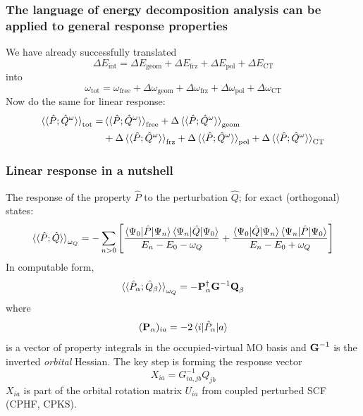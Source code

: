 \documentclass[%
    xcolor=usenames,dvipsnames,svgnames%
]{beamer}
\begin{document}
\begin{frame}
  \frametitle{The language of energy decomposition analysis can be applied to general response properties}
  We have already successfully translated
  \begin{equation*}
    \Delta E_{\text{int}} = \Delta E_{\text{geom}} + \Delta E_{\text{frz}} + \Delta E_{\text{pol}} + \Delta E_{\text{CT}}
  \end{equation*}
  into
  \begin{equation*}
    \omega_{\text{tot}} = \omega_{\text{free}} + \Delta \omega_{\text{geom}} + \Delta \omega_{\text{frz}} + \Delta \omega_{\text{pol}} + \Delta \omega_{\text{CT}}
  \end{equation*}
  Now do the same for linear response:
  \begin{equation*}
    \begin{aligned}
      \braket{\braket{\hat{P};\hat{Q}^{\omega}}}_{\text{tot}} = &\braket{\braket{\hat{P};\hat{Q}^{\omega}}}_{\text{free}} + \Delta \braket{\braket{\hat{P};\hat{Q}^{\omega}}}_{\text{geom}} \\
      &+ \Delta \braket{\braket{\hat{P};\hat{Q}^{\omega}}}_{\text{frz}} + \Delta \braket{\braket{\hat{P};\hat{Q}^{\omega}}}_{\text{pol}} + \Delta \braket{\braket{\hat{P};\hat{Q}^{\omega}}}_{\text{CT}}
    \end{aligned}
  \end{equation*}
\end{frame}

\begin{frame}
  \frametitle{Linear response in a nutshell}
  The response of the property \(\hat{P}\) to the perturbation \(\hat{Q}\); for exact (orthogonal) states:
  \begin{equation*}
    \braket{\braket{\hat{P};\hat{Q}}}_{\omega_{Q}} = - \sum_{n>0} \left[ \frac{\braket{\Psi_{0}|\hat{P}|\Psi_{n}}\braket{\Psi_{n}|\hat{Q}|\Psi_{0}}}{E_{n} - E_{0} - \omega_{Q}} + \frac{\braket{\Psi_{0}|\hat{Q}|\Psi_{n}}\braket{\Psi_{n}|\hat{P}|\Psi_{0}}}{E_{n} - E_{0} + \omega_{Q}} \right]
  \end{equation*}
  In computable form,
  \begin{equation*}
    \braket{\braket{\hat{P}_{\alpha};\hat{Q}_{\beta}}}_{\omega_{Q}} = - \boldsymbol{\mathbf{P}}_{\alpha}^{\dagger} \boldsymbol{\mathbf{G}}^{-1} \boldsymbol{\mathbf{Q}}_{\beta}
  \end{equation*}
  where
  \begin{equation*}
    (\boldsymbol{\mathbf{P}}_{\alpha})_{ia} = -2 \braket{ i | \hat{P}_{\alpha} | a }
  \end{equation*}
  is a vector of property integrals in the occupied-virtual MO basis and \(\boldsymbol{\mathbf{G}}^{-1}\) is the inverted \emph{orbital} Hessian. The key step is forming the response vector
  \begin{equation*}
    X_{ia} = G_{ia,jb}^{-1} Q_{jb}
  \end{equation*}
  \(X_{ia}\) is part of the orbital rotation matrix \(U_{ia}\) from coupled perturbed SCF (CPHF, CPKS).
\end{frame}
\end{document}
